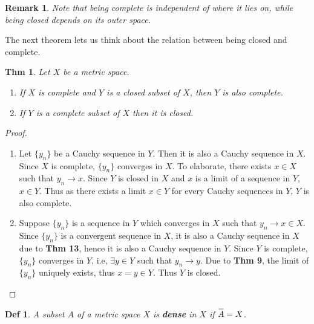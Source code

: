 \documentclass[paper=a4, fontsize=11pt]{scrartcl}
\newcommand{\overbar}[1]{
	\mkern 1.5mu \overline{\mkern-1.5mu\raisebox{0pt}[\dimexpr\height+0.5mm\relax]{$#1$}\mkern-1.5mu}\mkern 1.5mu
}
\newtheorem{theorem}{Thm}
\newtheorem{definition}{Def}
\newtheorem*{remark}{Remark}
\begin{document}
\begin{remark}
	Note that being complete is independent of where it lies on, while being closed depends on its outer space.\\
\end{remark}

The next theorem lets us think about the relation between being closed and complete.\\

\begin{theorem} Let $X$ be a metric space.
$ $ \newline
\vspace{-0.15in}
	\begin{enumerate}
		\item If $X$ is complete and $Y$ is a closed subset of $X$, then $Y$ is also complete.
		\item If $Y$ is a complete subset of $X$ then it is closed.\\
	\end{enumerate}
\end{theorem}

\begin{proof}
$ $ \newline
\vspace{-0.15in}
\begin{enumerate}
	\item Let $\{y_n\}$ be a Cauchy sequence in $Y$. Then it is also a Cauchy sequence in $X$. Since $X$ is complete, $\{y_n\}$ converges in $X$. To elaborate, there exists $x \in X$ such that $y_n \to x$. Since $Y$ is closed in $X$ and $x$ is a limit of a sequence in $Y$, $x \in Y$. Thus as there exists a limit $x\in Y$ for every Cauchy sequences in $Y$, $Y$ is also complete. 
	\item Suppose $\{y_n\}$ is a sequence in $Y$ which converges in $X$ such that $y_n \to x \in X$. Since $\{y_n\}$ is a convergent sequence in $X$, it is also a Cauchy sequence in $X$ due to \textbf{Thm 13}, hence it is also a Cauchy sequence in $Y$. Since $Y$ is complete, $\{y_n\}$ converges in $Y$, i.e, $\exists y\in Y$ such that $y_n \to y$. Due to \textbf{Thm 9}, the limit of $\{y_n\}$ uniquely exists, thus $x=y\in Y$. Thus $Y$ is closed.
\end{enumerate}
\end{proof}

\begin{definition}
	A subset $A$ of a metric space $X$ is \textbf{dense} in $X$ if $\overbar{A}=X$.
\end{definition}
\end{document}
